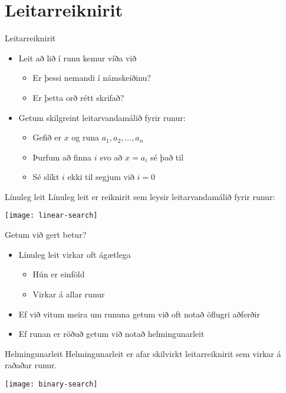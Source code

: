 \documentclass[handout]{beamer}
\begin{document}
\section{Leitarreiknirit}

\begin{frame}{Leitarreiknirit}
\begin{itemize}
 \item Leit að lið í runu kemur víða við
 \begin{itemize}
  \item Er þessi nemandi í námskeiðinu? 
  \item Er þetta orð rétt skrifað?
 \end{itemize}
 \item Getum skilgreint leitarvandamálið fyrir runur:
 \begin{itemize}
  \item Gefið er $x$ og runa $a_1, a_2, \ldots, a_n$
  \item Þurfum að finna $i$ svo að $x = a_i$ sé það til
  \item Sé slíkt $i$ ekki til segjum við $i = 0$
 \end{itemize}
\end{itemize}
\end{frame}

\begin{frame}{Línuleg leit}
Línuleg leit er reiknirit sem leysir leitarvandamálið fyrir runur:

\begin{center}
\texttt{[image: linear-search]}
\end{center}
\end{frame}

\begin{frame}{Getum við gert betur?}
\begin{itemize}
 \item Línuleg leit virkar oft ágætlega
 \begin{itemize}
  \item Hún er einföld
  \item Virkar á allar runur
 \end{itemize}
 \item Ef við vitum meira um rununa getum við oft notað öflugri aðferðir
 \item Ef runan er röðuð getum við notað helmingunarleit
\end{itemize}
\end{frame}

\begin{frame}{Helmingunarleit}
Helmingunarleit er afar skilvirkt leitarreiknirit sem virkar á raðaðar runur.

\begin{center}
\texttt{[image: binary-search]}
\end{center}
\end{frame}
\end{document}
